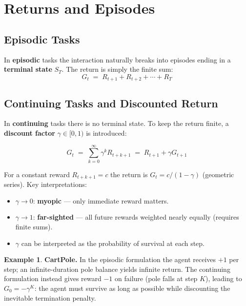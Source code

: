 \documentclass[11pt,a4paper]{article}
\theoremstyle{definition}
\newtheorem{example}{Example}[section]
\theoremstyle{plain}
\theoremstyle{remark}
\begin{document}
\section{Returns and Episodes}

\subsection{Episodic Tasks}

In \textbf{episodic} tasks the interaction naturally breaks into episodes ending in a \textbf{terminal state} $S_T$. The return is simply the finite sum:
\[
    G_t \;=\; R_{t+1} + R_{t+2} + \cdots + R_T
\]

\subsection{Continuing Tasks and Discounted Return}

In \textbf{continuing} tasks there is no terminal state. To keep the return finite, a \textbf{discount factor} $\gamma \in [0, 1)$ is introduced: %

\begin{tcolorbox}[colback=blue!5!white, colframe=blue!60!black, title={Discounted Return}]
\[
    G_t \;=\; \sum_{k=0}^{\infty} \gamma^k R_{t+k+1}
    \;=\; R_{t+1} + \gamma G_{t+1}
\]
\end{tcolorbox}

For a constant reward $R_{t+k+1} = c$ the return is $G_t = c/(1-\gamma)$ (geometric series). Key interpretations:
\begin{itemize}
    \item $\gamma \to 0$: \textbf{myopic} — only immediate reward matters.
    \item $\gamma \to 1$: \textbf{far-sighted} — all future rewards weighted nearly equally (requires finite sums).
    \item $\gamma$ can be interpreted as the probability of survival at each step.
\end{itemize}

\begin{example}
\textbf{CartPole.} In the episodic formulation the agent receives $+1$ per step; an infinite-duration pole balance yields infinite return. The continuing formulation instead gives reward $-1$ on failure (pole falls at step $K$), leading to $G_0 = -\gamma^K$: the agent must survive as long as possible while discounting the inevitable termination penalty.
\end{example}
\end{document}
